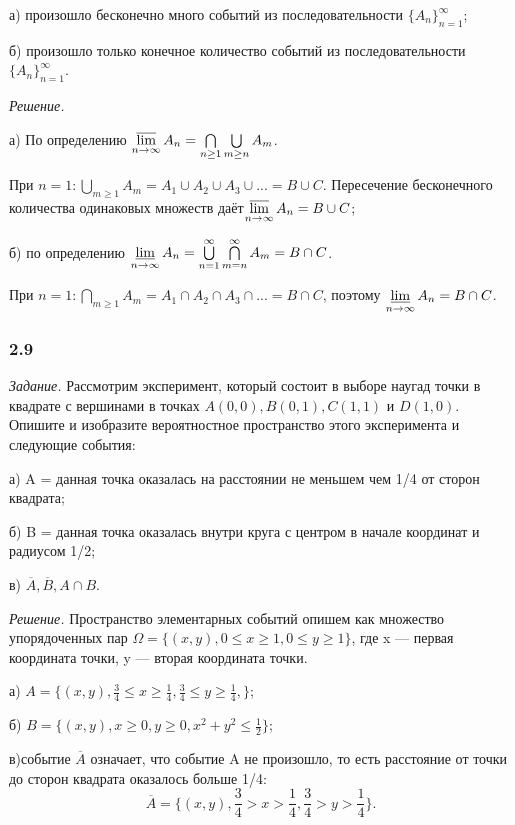 \documentclass{book}
\begin{document}
а) произошло бесконечно много событий из последовательности $\{A_n\}_{n=1}^\infty$;

б) произошло только конечное количество событий из последовательности $\{A_n\}_{n=1}^\infty$.

\textit{Решение.}

а) По определению $\varlimsup\limits_{n\to\infty}A_n=\bigcap\limits_{n\geq 1}\bigcup\limits_{m\geq n}A_m$.

При $n=1: \bigcup\limits_{m\geq 1}A_m=A_1\cup A_2\cup A_3\cup...=B\cup C$. Пересечение бесконечного количества одинаковых множеств даёт$\varlimsup\limits_{n\to\infty}A_n=B\cup C$;

б) по определению $\varliminf\limits_{n\to\infty}A_n=\bigcup\limits_{n=1}^\infty\bigcap\limits_{m=n}^\infty A_m=B\cap C$.

При $n=1: \bigcap\limits_{m\geq 1}A_m=A_1\cap A_2\cap A_3\cap...=B\cap C$, поэтому $\varliminf\limits_{n\to\infty}A_n=B\cap C$.

\subsubsection*{2.9}

\textit{Задание.} Рассмотрим эксперимент, который состоит в выборе наугад точки в квадрате с вершинами в точках $A(0, 0), B(0, 1), C(1, 1)$ и $D(1, 0)$. Опишите и изобразите вероятностное пространство этого эксперимента и следующие события:

а) A = {данная точка оказалась на расстоянии не меньшем чем 1/4 от сторон квадрата};

б) B = {данная точка оказалась внутри круга с центром в начале координат и радиусом 1/2};

в) $\overline{A}, \overline{B}, A\cap B$.

\textit{Решение.} Пространство элементарных событий опишем как множество упорядоченных пар $\Omega=\{(x, y), 0\leq x\geq 1, 0\leq y\geq 1\}$, где x --- первая координата точки, y --- вторая координата точки.

а) $A=\{(x, y), \frac{3}{4}\leq x\geq\frac{1}{4}, \frac{3}{4}\leq y\geq\frac{1}{4}, \}$;

б) $B=\{(x, y), x\geq 0, y\geq 0, x^2+y^2\leq\frac{1}{2}\}$;

в)событие $\overline{A}$ означает, что событие A не произошло, то есть расстояние от точки до сторон квадрата оказалось больше 1/4: $$\overline{A}=\{(x, y), \frac{3}{4}>x>\frac{1}{4}, \frac{3}{4}>y>\frac{1}{4}\}.$$
\end{document}
